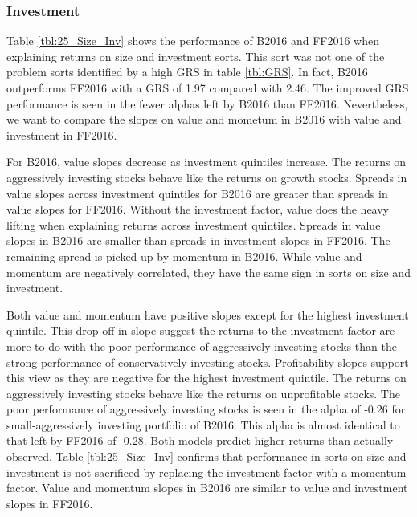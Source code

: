 
\subsubsection{Investment}


Table \ref{tbl:25_Size_Inv} shows the performance of B2016 and FF2016 when explaining
returns on size and investment sorts. This sort was not one of the problem sorts
identified by a high GRS in table \ref{tbl:GRS}. In fact, B2016 outperforms FF2016 with a
GRS of 1.97 compared with 2.46. The improved GRS performance is seen in the fewer alphas
left by B2016 than FF2016. Nevertheless, we want to compare the slopes on value and
mometum in B2016 with value and investment in FF2016.

For B2016, value slopes decrease as investment quintiles increase. The returns on
aggressively investing stocks behave like the returns on growth stocks. Spreads in value
slopes across investment quintiles for B2016 are greater than spreads in value slopes for
FF2016. Without the investment factor, value does the heavy lifting when explaining
returns across investment quintiles. Spreads in value slopes in B2016 are smaller than
spreads in investment slopes in FF2016. The remaining spread is picked up by momentum in
B2016. While value and momentum are negatively correlated, they have the same sign in
sorts on size and investment.

Both value and momentum have positive slopes except for the highest investment quintile.
This drop-off in slope suggest the returns to the investment factor are more to do with
the poor performance of aggressively investing stocks than the strong performance of
conservatively investing stocks. Profitability slopes support this view as they are
negative for the highest investment quintile. The returns on aggressively investing stocks
behave like the returns on unprofitable stocks. The poor performance of aggressively
investing stocks is seen in the alpha of -0.26 for small-aggressively investing portfolio
of B2016. This alpha is almost identical to that left by FF2016 of -0.28. Both models
predict higher returns than actually observed. Table \ref{tbl:25_Size_Inv} confirms that
performance in sorts on size and investment is not sacrificed by replacing the investment
factor with a momentum factor. Value and momentum slopes in B2016 are similar to value and
investment slopes in FF2016.

